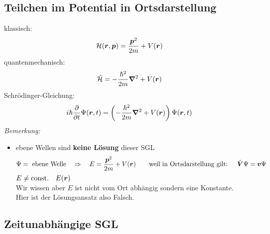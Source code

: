 \subsection{Teilchen im Potential in Ortsdarstellung}

klassisch:
\begin{equation*}
\mathcal{H}(\bm{r},\bm{p}) = \frac{\bm{p}^2}{2 m} + V(\bm{r})
\end{equation*}
quantenmechanisch:
\begin{equation*}
\hat{\mathcal{H}} = - \frac{\hbar^2}{2 m} \bm{\nabla}^2 + V(\bm{r})
\end{equation*}
Schrödinger-Gleichung:
\begin{equation*}
i \hbar \frac{\partial }{\partial t} \Psi(\bm{r},t) = \left(- \frac{\hbar^2}{2 m} \bm{\nabla}^2 + V(\bm{r})\right) \Psi(\bm{r},t)
\end{equation*}
\emph{Bemerkung:}
\begin{itemize}
	\item ebene Wellen sind \textbf{keine Lösung} dieser SGL
	\begin{equation*}
	\Psi = \textrm{ ebene Welle} \quad \Rightarrow \quad E = \frac{\bm{p}^2}{2 m} + V(\bm{r}) \qquad \textrm{weil in Ortsdarstellung gilt: } \quad \hat{\bm{V}} \Psi = \bm{v} \Psi 
	\end{equation*}
	\LARGE{\lightning} \normalsize $ E \neq \textrm{const.} \quad E(\bm{r}) $\\
	Wir wissen aber $ E $ ist nicht vom Ort abhängig sondern eine Konstante.\\
	Hier ist der Lösungsansatz also Falsch. \LARGE{\lightning} \normalsize
\end{itemize}

\subsection{Zeitunabhängige SGL}

